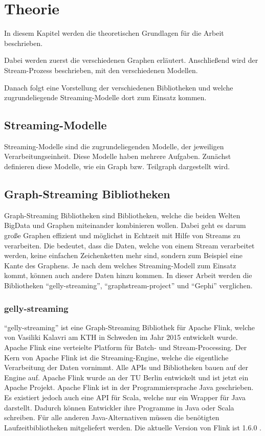 \chapter{Theorie}
In diesem Kapitel werden die theoretischen Grundlagen für die Arbeit beschrieben.

Dabei werden zuerst die verschiedenen Graphen erläutert. Anschließend wird der
Stream-Prozess beschrieben, mit den verschiedenen Modellen.

Danach folgt eine Vorstellung der verschiedenen Bibliotheken und welche
zugrundeliegende Streaming-Modelle dort zum Einsatz kommen. 

\section{Streaming-Modelle}
Streaming-Modelle sind die zugrundeliegenden Modelle, der
jeweiligen Verarbeitungseinheit. Diese Modelle haben mehrere Aufgaben. Zunächst
definieren diese Modelle, wie ein Graph bzw. Teilgraph dargestellt wird.


\section{Graph-Streaming Bibliotheken}
Graph-Streaming Bibliotheken sind Bibliotheken, welche die beiden Welten \gls{BigData}
und Graphen miteinander kombinieren wollen. Dabei geht es darum große Graphen
effizient und möglichst in Echtzeit mit Hilfe von Streams zu verarbeiten. Die
bedeutet, dass die Daten, welche von einem Stream verarbeitet werden, keine
einfachen Zeichenketten mehr sind, sondern zum Beispiel eine Kante des Graphens.
Je nach dem welches Streaming-Modell zum Einsatz kommt, können auch andere Daten
hinzu kommen. In dieser Arbeit werden die Bibliotheken \enquote{gelly-streaming},
\enquote{graphstream-project} und \enquote{Gephi} verglichen.

\subsection{gelly-streaming}
\enquote{gelly-streaming} ist eine Graph-Streaming Bibliothek für Apache Flink,
welche von Vasiliki Kalavri am KTH in Schweden im Jahr 2015 entwickelt wurde.
Apache Flink eine verteielte Platform für Batch- und Stream-Processing. Der Kern
von Apache Flink ist die Streaming-Engine, welche die eigentliche Verarbeitung
der Daten vornimmt. Alle \glspl{API} und Bibliotheken bauen auf der Engine auf.
Apache Flink wurde an der TU Berlin entwickelt und ist jetzt ein Apache Projekt.
Apache Flink ist in der Programmiersprache Java geschrieben. Es existiert jedoch
auch eine \gls{API} für Scala, welche nur ein Wrapper für Java darstellt. Dadurch
können Entwickler ihre Programme in Java oder Scala schreiben. Für alle anderen
Java-Alternativen müssen die benötigten Laufzeitbibliotheken mitgeliefert
werden. Die aktuelle Version von Flink ist 1.6.0 .

